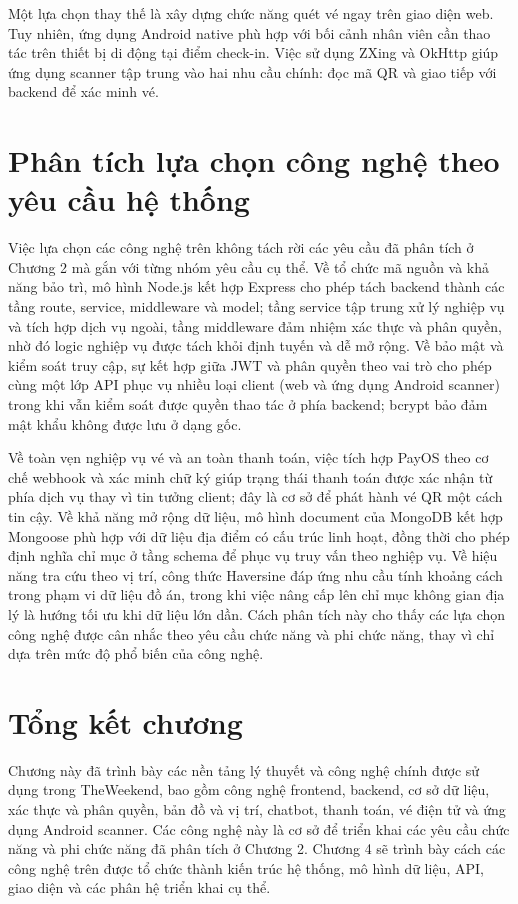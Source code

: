 \documentclass[../DoAn.tex]{subfiles}
\begin{document}
Một lựa chọn thay thế là xây dựng chức năng quét vé ngay trên giao diện web. Tuy nhiên, ứng dụng Android native phù hợp với bối cảnh nhân viên cần thao tác trên thiết bị di động tại điểm check-in. Việc sử dụng ZXing và OkHttp giúp ứng dụng scanner tập trung vào hai nhu cầu chính: đọc mã QR và giao tiếp với backend để xác minh vé.

\section{Phân tích lựa chọn công nghệ theo yêu cầu hệ thống}

Việc lựa chọn các công nghệ trên không tách rời các yêu cầu đã phân tích ở Chương 2 mà gắn với từng nhóm yêu cầu cụ thể. Về tổ chức mã nguồn và khả năng bảo trì, mô hình Node.js kết hợp Express cho phép tách backend thành các tầng route, service, middleware và model; tầng service tập trung xử lý nghiệp vụ và tích hợp dịch vụ ngoài, tầng middleware đảm nhiệm xác thực và phân quyền, nhờ đó logic nghiệp vụ được tách khỏi định tuyến và dễ mở rộng. Về bảo mật và kiểm soát truy cập, sự kết hợp giữa JWT và phân quyền theo vai trò cho phép cùng một lớp API phục vụ nhiều loại client (web và ứng dụng Android scanner) trong khi vẫn kiểm soát được quyền thao tác ở phía backend; bcrypt bảo đảm mật khẩu không được lưu ở dạng gốc.

Về toàn vẹn nghiệp vụ vé và an toàn thanh toán, việc tích hợp PayOS theo cơ chế webhook và xác minh chữ ký giúp trạng thái thanh toán được xác nhận từ phía dịch vụ thay vì tin tưởng client; đây là cơ sở để phát hành vé QR một cách tin cậy. Về khả năng mở rộng dữ liệu, mô hình document của MongoDB kết hợp Mongoose phù hợp với dữ liệu địa điểm có cấu trúc linh hoạt, đồng thời cho phép định nghĩa chỉ mục ở tầng schema để phục vụ truy vấn theo nghiệp vụ. Về hiệu năng tra cứu theo vị trí, công thức Haversine đáp ứng nhu cầu tính khoảng cách trong phạm vi dữ liệu đồ án, trong khi việc nâng cấp lên chỉ mục không gian địa lý là hướng tối ưu khi dữ liệu lớn dần. Cách phân tích này cho thấy các lựa chọn công nghệ được cân nhắc theo yêu cầu chức năng và phi chức năng, thay vì chỉ dựa trên mức độ phổ biến của công nghệ.

\section{Tổng kết chương}

Chương này đã trình bày các nền tảng lý thuyết và công nghệ chính được sử dụng trong TheWeekend, bao gồm công nghệ frontend, backend, cơ sở dữ liệu, xác thực và phân quyền, bản đồ và vị trí, chatbot, thanh toán, vé điện tử và ứng dụng Android scanner. Các công nghệ này là cơ sở để triển khai các yêu cầu chức năng và phi chức năng đã phân tích ở Chương 2. Chương 4 sẽ trình bày cách các công nghệ trên được tổ chức thành kiến trúc hệ thống, mô hình dữ liệu, API, giao diện và các phân hệ triển khai cụ thể.
\end{document}
